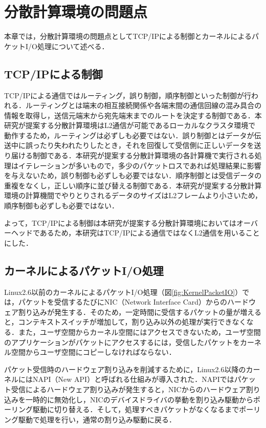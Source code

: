 \section{分散計算環境の問題点}
\label{sec:Problem}
本章では，分散計算環境の問題点としてTCP/IPによる制御とカーネルによるパケットI/O処理について述べる．

\subsection{TCP/IPによる制御}
TCP/IPによる通信ではルーティング，誤り制御，順序制御といった制御が行われる．ルーティングとは端末の相互接続関係や各端末間の通信回線の混み具合の情報を取得し，送信元端末から宛先端末までのルートを決定する制御である．本研究が提案する分散計算環境はL2通信が可能であるローカルなクラスタ環境で動作するため，ルーティングは必ずしも必要ではない．誤り制御とはデータが伝送中に誤ったり失われたりしたとき，それを回復して受信側に正しいデータを送り届ける制御である．本研究が提案する分散計算環境の各計算機で実行される処理はイテレーションが多いもので，多少のパケットロスであれば処理結果に影響を与えないため，誤り制御も必ずしも必要ではない．順序制御とは受信データの重複をなくし，正しい順序に並び替える制御である．本研究が提案する分散計算環境の計算機間でやりとりされるデータのサイズはL2フレームより小さいため，順序制御も必ずしも必要ではない．

よって，TCP/IPによる制御は本研究が提案する分散計算環境においてはオーバーヘッドであるため，本研究はTCP/IPによる通信ではなくL2通信を用いることにした．

\subsection{カーネルによるパケットI/O処理}
Linux2.6以前のカーネルによるパケットI/O処理（図\ref{fig:KernelPacketIO}）では，パケットを受信するたびにNIC（Network Interface Card）からのハードウェア割り込みが発生する．そのため，一定時間に受信するパケットの量が増えると，コンテキストスイッチが増加して，割り込み以外の処理が実行できなくなる．また，ユーザ空間からカーネル空間にはアクセスできないため，ユーザ空間のアプリケーションがパケットにアクセスするには，受信したパケットをカーネル空間からユーザ空間にコピーしなければならない．

パケット受信時のハードウェア割り込みを削減するために，Linux2.6以降のカーネルにはNAPI（New API）と呼ばれる仕組みが導入された．NAPIではパケット受信によるハードウェア割り込みが発生すると，NICからのハードウェア割り込みを一時的に無効化し，NICのデバイスドライバの挙動を割り込み駆動からポーリング駆動に切り替える．そして，処理すべきパケットがなくなるまでポーリング駆動で処理を行い，通常の割り込み駆動に戻る．

